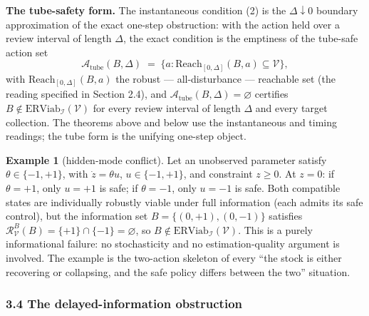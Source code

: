 \documentclass[11pt]{article}
\theoremstyle{definition}
\newtheorem{example}{Example}
\begin{document}
\textbf{The tube-safety form.} The instantaneous condition (2) is the
\(\Delta \downarrow 0\) boundary approximation of the exact one-step
obstruction: with the action held over a review interval of length
\(\Delta\), the exact condition is the emptiness of the tube-safe action
set
\[\mathcal{A}_{\mathrm{tube}}(B, \Delta) \;=\; \Big\{ a : \mathrm{Reach}_{[0,\Delta]}(B, a) \subseteq \mathcal{V} \Big\},\]
with \(\mathrm{Reach}_{[0,\Delta]}(B, a)\) the robust ---
all-disturbance --- reachable set (the reading specified in Section 2.4),
and \(\mathcal{A}_{\mathrm{tube}}(B, \Delta) = \varnothing\) certifies
\(B \notin \mathrm{ERViab}_{\mathcal{I}}(\mathcal{V})\) for every review
interval of length \(\Delta\) and every target collection. The theorems
above and below use the instantaneous and timing readings; the tube form
is the unifying one-step object.

\begin{example}[hidden-mode conflict]\label{ex:hidden-mode} Let an unobserved parameter satisfy
\(\theta \in \{-1, +1\}\), with \(\dot z = \theta u\),
\(u \in \{-1, +1\}\), and constraint \(z \ge 0\). At \(z = 0\): if
\(\theta = +1\), only \(u = +1\) is safe; if \(\theta = -1\), only
\(u = -1\) is safe. Both compatible states are individually robustly
viable under full information (each admits its safe control), but the
information set \(B = \{(0, +1), (0, -1)\}\) satisfies
\(\mathcal{R}_{\mathcal{V}}^B(B) = \{+1\} \cap \{-1\} = \varnothing\),
so \(B \notin \mathrm{ERViab}_{\mathcal{I}}(\mathcal{V})\). This is a
purely informational failure: no stochasticity and no estimation-quality
argument is involved. The example is the two-action skeleton of every
``the stock is either recovering or collapsing, and the safe policy
differs between the two'' situation.

\end{example}

\subsubsection{3.4 The delayed-information
obstruction}\label{the-delayed-information-obstruction}
\end{document}
